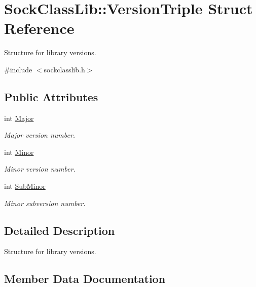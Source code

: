 \hypertarget{structSockClassLib_1_1VersionTriple}{}\section{Sock\+Class\+Lib\+:\+:Version\+Triple Struct Reference}
\label{structSockClassLib_1_1VersionTriple}


Structure for library versions.  




{\ttfamily \#include $<$sockclasslib.\+h$>$}

\subsection*{Public Attributes}
\begin{DoxyCompactItemize}
\item 
int \hyperlink{structSockClassLib_1_1VersionTriple_a79ce564464e6d4e6fca3d7fc51b42bdd}{Major}
\begin{DoxyCompactList}\small\item\em Major version number. \end{DoxyCompactList}\item 
int \hyperlink{structSockClassLib_1_1VersionTriple_a4588deee7b7e148775da4407af465b8f}{Minor}
\begin{DoxyCompactList}\small\item\em Minor version number. \end{DoxyCompactList}\item 
int \hyperlink{structSockClassLib_1_1VersionTriple_a5ca64bcae906bbd9a629c905548dd845}{Sub\+Minor}
\begin{DoxyCompactList}\small\item\em Minor subversion number. \end{DoxyCompactList}\end{DoxyCompactItemize}


\subsection{Detailed Description}
Structure for library versions. 

\subsection{Member Data Documentation}
\mbox{\label{structSockClassLib_1_1VersionTriple_a79ce564464e6d4e6fca3d7fc51b42bdd}} 
